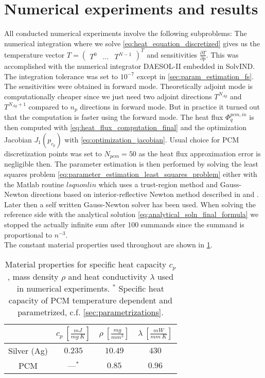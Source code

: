 \documentclass{scrartcl}[12pt, halfparskip]
\numberwithin{equation}{section}
\numberwithin{figure}{section}
\numberwithin{table}{section}
\begin{document}
\section{Numerical experiments and results}
\label{sec:numerical_experiments}
All conducted numerical experiments involve the following subproblems: The numerical integration where we solve \cref{eq:heat_equation_discretized} gives us the temperature vector $T = \begin{pmatrix} T^0 & ... & T^{N-1}  \end{pmatrix}^T$ and sensitivities $\frac{\partial T}{\partial p}$. This was accomplished with the numerical integrator DAESOL-II embedded in SolvIND. The integration tolerance was set to $10^{-7}$ except in \cref{sec:param_estimation_fs}.
The sensitivities were obtained in forward mode. Theoretically adjoint mode is computationally cheaper since we just need two adjoint directions $T^{N_{Ag}}$ and $T^{N_{Ag}+1}$ compared to $n_p$ directions in forward mode. But in practice it turned out that the computation is faster using the forward mode.
The heat flux $\varPhi_q^{pcm,in}$ is then computed with \cref{eq:heat_flux_computation_final} and the optimization Jacobian $J_1(p_{c_p})$ with \cref{eq:optimization_jacobian}. Usual choice for PCM discretization points was set to $N_{pcm}=50$ as the heat flux approximation error is negligible then. The parameter estimation is then performed by solving the least squares problem \cref{eq:parameter_estimation_least_squares_problem} either with the Matlab routine $lsqnonlin$ which uses a trust-region method and Gauss-Newton directions based on interior-reflective Newton method described in \cite{lsqnonlin_alg1} and \cite{lsqnonlin_alg2}. Later then a self written Gauss-Newton solver has been used.
When solving the reference side with the analytical solution \cref{eq:analytical_soln_final_formula} we stopped the actually infinite sum after 100 summands since the summand is proportional to $n^{-3}$. \\

The constant material properties used throughout are shown in \cref{tab:const_material_properties}.

\begin{table}[H]
	\centering
	\begin{tabular}{| c | c | c | c |} \hline
		& $c_p \ [\frac{mJ}{mg \ K}]$ & $\rho \ [\frac{mg}{mm^3}]$ & $\lambda \ [\frac{mW}{mm \ K}]$ \\ \hline
		Silver (Ag) & $0.235$ & $10.49$ & $430$ \\
		PCM & ---$^*$ & $0.85$ & $0.96$ \\ \hline
	\end{tabular}
	\caption{Material properties for specific heat capacity $c_p$, mass density $\rho$ and heat conductivity $\lambda$ used in numerical experiments. $^*$ Specific heat capacity of PCM temperature dependent and parametrized, c.f. \cref{sec:parametrizations}.}
	\label{tab:const_material_properties}
\end{table}
\end{document}
